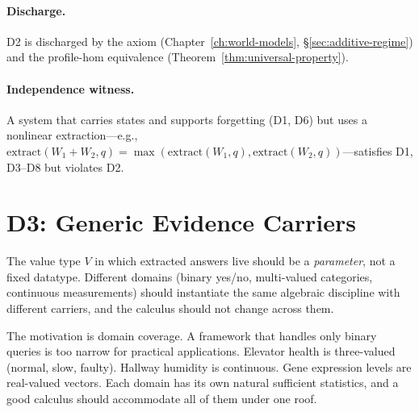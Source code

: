 \paragraph{Discharge.}
D2 is discharged by the  axiom
 (Chapter~\ref{ch:world-models},
\S\ref{sec:additive-regime}) and the profile-hom equivalence
(Theorem~\ref{thm:universal-property}).

\paragraph{Independence witness.}
A system that carries states and supports forgetting (D1, D6) but
uses a nonlinear extraction---e.g.,
$\mathrm{extract}(W_1 + W_2, q) = \max(\mathrm{extract}(W_1, q),
\mathrm{extract}(W_2, q))$---satisfies D1, D3--D8 but violates D2.



\section{D3: Generic Evidence Carriers}
\label{sec:d3}

\begin{definition}
\label{def:d3}
The value type $V$ in which extracted answers live should be a
\emph{parameter}, not a fixed datatype.  Different domains (binary
yes/no, multi-valued categories, continuous measurements) should
instantiate the same algebraic discipline with different carriers,
and the calculus should not change across them.
\end{definition}

\noindent
The motivation is domain coverage.  A framework that handles only
binary queries is too narrow for practical applications.  Elevator
health is three-valued (normal, slow, faulty).  Hallway humidity is
continuous.  Gene expression levels are real-valued vectors.  Each
domain has its own natural sufficient statistics, and a good calculus
should accommodate all of them under one roof.

